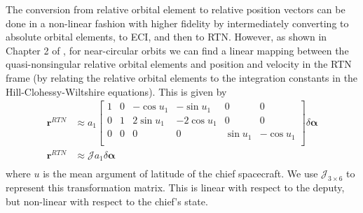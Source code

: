 The conversion from relative orbital element to relative position vectors can be done in a non-linear fashion with higher fidelity by intermediately converting to absolute orbital elements, to ECI, and then to RTN. However, as shown in Chapter 2 of \cite{damicothesis}, for near-circular orbits we can find a linear mapping between the quasi-nonsingular relative orbital elements and position and velocity in the RTN frame (by relating the relative orbital elements to the integration constants in the Hill-Clohessy-Wiltshire equations). This is given by
\begin{align}
\boldsymbol{r}^{RTN} &\approx a_1
\begin{bmatrix}
1 & 0 & -\cos u_1 & -\sin u_1 & 0 & 0 \\
0 & 1 & 2\sin u_1 & -2\cos u_1 & 0 & 0 \\
0 & 0 & 0 & 0 & \sin u_1 & -\cos u_1 \\
\end{bmatrix}
\delta \boldsymbol{\alpha} \\
\boldsymbol{r}^{RTN} &\approx 
\mathcal{J}
a_1\delta \boldsymbol{\alpha} \\
\end{align}
where $u$ is the mean argument of latitude of the chief spacecraft. We use $\mathcal{J}_{3\times 6}$ to represent this transformation matrix. This is linear with respect to the deputy, but non-linear with respect to the chief's state.

